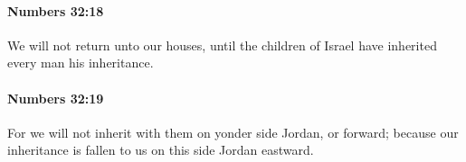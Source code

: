 		\paragraph{Numbers 32:18} %
			\label{NUMBERS-32-18}

			We will not return unto our houses, until the children of Israel have inherited every man his inheritance.


		\paragraph{Numbers 32:19} %
			\label{NUMBERS-32-19}

			For we will not inherit with them on yonder side Jordan, or forward; because our inheritance is fallen to us on this side Jordan eastward.


